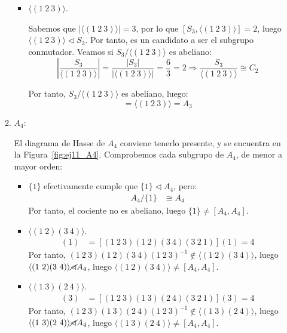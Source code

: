 \begin{ejercicio}
\begin{enumerate}
\begin{enumerate}
\begin{itemize}
                \item $\langle (1\ 2\ 3)\rangle$.
                
                Sabemos que $|\langle (1\ 2\ 3)\rangle|=3$, por lo que $[S_3,\langle (1\ 2\ 3)\rangle]=2$, luego $\langle (1\ 2\ 3)\rangle \lhd S_3$. Por tanto, es un candidato a ser el subgrupo conmutador. Veamos si $S_3/\langle (1\ 2\ 3)\rangle$ es abeliano:
                \begin{equation*}
                    \left|\dfrac{S_3}{\langle (1\ 2\ 3)\rangle}\right| = \frac{|S_3|}{|\langle (1\ 2\ 3)\rangle|} = \frac{6}{3} = 2
                    \Longrightarrow \dfrac{S_3}{\langle (1\ 2\ 3)\rangle} \cong C_2
                \end{equation*}

                Por tanto, $S_3/\langle (1\ 2\ 3)\rangle$ es abeliano, luego:
                \begin{equation*}
                    [S_3,S_3] = \langle (1\ 2\ 3)\rangle = A_3
                \end{equation*}
            \end{itemize}

            \item $A_4$:
            
            El diagrama de Hasse de $A_4$ conviene tenerlo presente, y se encuentra en la Figura~\ref{fig:ej11_A4}. Comprobemos cada subgrupo de $A_4$, de menor a mayor orden:
            \begin{itemize}
                \item $\{1\}$ efectivamente cumple que $\{1\}\lhd A_4$, pero:
                \begin{align*}
                    A_4/\{1\} &\cong A_4
                \end{align*}
                Por tanto, el cociente no es abeliano, luego $\{1\}\neq [A_4,A_4]$.

                \item $\langle (1\ 2)(3\ 4)\rangle$.
                \begin{align*}
                    [(1\ 2\ 3)(1\ 2)(3\ 4)(1\ 2\ 3)^{-1}](1) &= [(1\ 2\ 3)(1\ 2)(3\ 4)(3\ 2\ 1)](1) = 4
                \end{align*}
                Por tanto, $(1\ 2\ 3)(1\ 2)(3\ 4)(1\ 2\ 3)^{-1}\notin \langle (1\ 2)(3\ 4)\rangle$, luego $\langle (1\ 2)(3\ 4)\rangle \cancel{\lhd} A_4$, luego $\langle (1\ 2)(3\ 4)\rangle \neq [A_4,A_4]$.

                \item $\langle (1\ 3)(2\ 4)\rangle$.
                \begin{align*}
                    [(1\ 2\ 3)(1\ 3)(2\ 4)(1\ 2\ 3)^{-1}](3) &= [(1\ 2\ 3)(1\ 3)(2\ 4)(3\ 2\ 1)](3) = 4
                \end{align*}
                Por tanto, $(1\ 2\ 3)(1\ 3)(2\ 4)(1\ 2\ 3)^{-1}\notin \langle (1\ 3)(2\ 4)\rangle$, luego $\langle (1\ 3)(2\ 4)\rangle \cancel{\lhd} A_4$, luego $\langle (1\ 3)(2\ 4)\rangle \neq [A_4,A_4]$.


\end{itemize}
\end{enumerate}
\end{enumerate}
\end{ejercicio}
